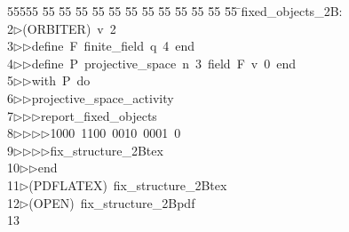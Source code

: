 %
%
\begin{tabbing}
55555 \= 55 \= 55 \= 55 \= 55 \= 55 \= 55 \= 55 \= 55 \= 55 \= 55 \= 55 \= 55 \= \>fixed\_objects\_2B:\\[0pt]
2\>$\triangleright$\>(ORBITER)\ v\ 2\ \\[0pt]
3\>$\triangleright$\>$\triangleright$\>define\ F\ finite\_field\ q\ 4\ end\ \\[0pt]
4\>$\triangleright$\>$\triangleright$\>define\ P\ projective\_space\ n\ 3\ field\ F\ v\ 0\ end\ \\[0pt]
5\>$\triangleright$\>$\triangleright$\>with\ P\ do\ \\[0pt]
6\>$\triangleright$\>$\triangleright$\>projective\_space\_activity\ \\[0pt]
7\>$\triangleright$\>$\triangleright$\>$\triangleright$\>report\_fixed\_objects\ \\[0pt]
8\>$\triangleright$\>$\triangleright$\>$\triangleright$\>$\triangleright$\>1000\ 1100\ 0010\ 0001\ 0\ \\[0pt]
9\>$\triangleright$\>$\triangleright$\>$\triangleright$\>$\triangleright$\>fix\_structure\_2Btex\ \\[0pt]
10\>$\triangleright$\>$\triangleright$\>end\ \\[0pt]
11\>$\triangleright$\>(PDFLATEX)\ fix\_structure\_2Btex\\[0pt]
12\>$\triangleright$\>(OPEN)\ fix\_structure\_2Bpdf\\[0pt]
13\>\end{tabbing}
